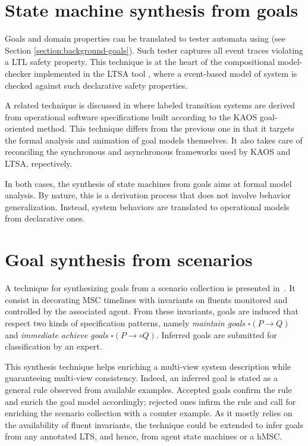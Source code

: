 
\section{State machine synthesis from goals}

Goals and domain properties can be translated to tester automata using \cite{Giannakopoulou:2003} (see Section \ref{section:background-goals}). Such tester captures all event traces violating a LTL safety property. This technique is at the heart of the compositional model-checker implemented in the LTSA tool \cite{Magee:1999}, where a event-based model of system is checked against such declarative safety properties. 

A related technique is discussed in \cite{Letier:2008} where labeled transition systems are derived from operational software specifications built according to the KAOS goal-oriented method. This technique differs from the previous one in that it targets the formal analysis and animation of goal models themselves. It also takes care of reconciling the synchronous and asynchronous frameworks used by KAOS and LTSA, repectively.  

In both cases, the synthesis of state machines from goals aims at formal model analysis. By nature, this is a derivation process that does not involve behavior generalization. Instead, system behaviors are translated to operational models from declarative ones. 


\section{Goal synthesis from scenarios}

A technique for synthesizing goals from a scenario collection is presented in~\cite{Damas:2006}. It consist in decorating MSC timelines with invariants on fluents monitored and controlled by the associated agent. From these invariants, goals are induced that respect two kinds of specification patterns, namely \emph{maintain goals} $\square(P \rightarrow Q)$ and \emph{immediate achieve goals} $\square(P \rightarrow \circ Q)$. Inferred goals are submitted for classification by an expert. 

This synthesis technique helps enriching a multi-view system description while guaranteeing multi-view consistency. Indeed, an inferred goal is stated as a general rule observed from available examples. Accepted goals confirm the rule and enrich the goal model accordingly; rejected ones infirm the rule and call for enriching the scenario collection with a counter example. As it mostly relies on the availability of fluent invariants, the technique could be extended to infer goals from any annotated LTS, and hence, from agent state machines or a hMSC. 

